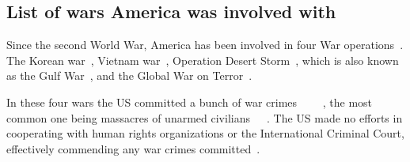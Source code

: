 \subsection{List of wars America was involved with}
Since the second World War, America has been involved in four War operations~\autocite{va-gov-american-wars}.
The Korean war~\autocite{va-gov-american-wars}, Vietnam war~\autocite{va-gov-american-wars}, Operation Desert Storm~\autocite{va-gov-american-wars}, which is also known as the Gulf War~\autocite{defense-gov-gulf}, and the Global War on Terror~\autocite{va-gov-american-wars}.

In these four wars the US committed a bunch of war crimes ~\autocite{globalpolicy-iraq-warcrimes}~\autocite{historynews-vietnam-warcrimes}~\autocite{hrw-hr-abuses-afghanistan}~\autocite{washingtonpost-korea-warcrimes}, the most common one being massacres of unarmed civilians~\autocite{asiasociety-nogun-ri}~\autocite{history-my-lai}~\autocite{theguardian-shinwar-shooting}. The US made no efforts in cooperating with human rights organizations or the International Criminal Court, effectively commending any war crimes committed~\autocite{globaltimes-us-evade-warcrimes}.